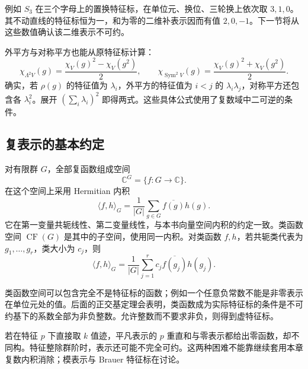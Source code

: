 例如 \(S_3\) 在三个字母上的置换特征标，在单位元、换位、三轮换上依次取 \(3,1,0\)。其不动直线的特征标恒为一，和为零的二维补表示因而有值 \(2,0,-1\)。下一节将从这些数值确认该二维表示不可约。

\ProseParagraphBreak
外平方与对称平方也能从原特征标计算：
\begin{equation}\label{b5:eq:symmetric-exterior-character}
	\chi_{\Lambda^2V}(g)=\frac{\chi_V(g)^2-\chi_V(g^2)}2,\qquad \chi_{\operatorname{Sym}^2V}(g)=\frac{\chi_V(g)^2+\chi_V(g^2)}2.
\end{equation}
确实，若 \(\rho(g)\) 的特征值为 \(\lambda_i\)，外平方的特征值为 \(i<j\) 的 \(\lambda_i\lambda_j\)，对称平方还包含各 \(\lambda_i^2\)。展开 \((\sum_i\lambda_i)^2\) 即得两式。这些具体公式使用了复数域中二可逆的条件。

\subsection{复表示的基本约定}
\label{b5:subsec:0201:03}

对有限群 \(G\)，全部复函数组成空间
\[
	\mathbb C^G=\{f:G\to\mathbb C\}.
\]
在这个空间上采用 Hermitian 内积
\begin{equation}\label{b5:eq:character-inner-product}
	\langle f,h\rangle_G=\frac1{|G|}\sum_{g\in G}\overline{f(g)}h(g).
\end{equation}
它在第一变量共轭线性、第二变量线性，与本书向量空间内积的约定一致。类函数空间 \(\operatorname{CF}(G)\) 是其中的子空间，使用同一内积。对类函数 \(f,h\)，若共轭类代表为 \(g_1,\ldots,g_r\)，类大小为 \(c_j\)，则
\[
	\langle f,h\rangle_G=\frac1{|G|}\sum_{j=1}^r c_j\overline{f(g_j)}h(g_j).
\]

类函数空间可以包含完全不是特征标的函数；例如一个任意负常数不能是非零表示在单位元处的值。后面的正交基定理会表明，类函数成为实际特征标的条件是不可约基下的系数全部为非负整数。允许整数而不要求非负，则得到虚特征标。

\ProseParagraphBreak
若在特征 \(p\) 下直接取 \(k\) 值迹，平凡表示的 \(p\) 重直和与零表示都给出零函数，却不同构。特征整除群阶时，表示还可能不完全可约。这两种困难不能靠继续套用本章复数内积消除；模表示与 Brauer 特征标在讨论。
